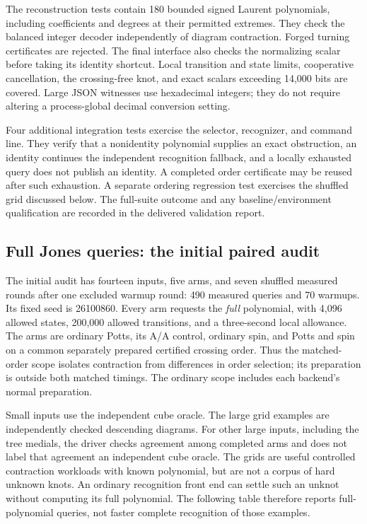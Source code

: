 The reconstruction tests contain 180 bounded signed Laurent polynomials,
including coefficients and degrees at their permitted extremes. They check
the balanced integer decoder independently of diagram contraction. Forged
turning certificates are rejected. The final interface also checks the
normalizing scalar before taking its identity shortcut. Local transition
and state limits, cooperative cancellation, the crossing-free knot,
and exact scalars exceeding 14,000 bits are covered. Large JSON witnesses
use hexadecimal integers; they do not require altering a process-global
decimal conversion setting.

Four additional integration tests exercise the selector, recognizer, and
command line. They verify that a nonidentity polynomial supplies an exact
obstruction, an identity continues the independent recognition fallback,
and a locally exhausted query does not publish an identity. A completed
order certificate may be reused after such exhaustion. A separate ordering
regression test exercises the shuffled grid discussed below. The full-suite
outcome and any baseline/environment qualification are recorded in the
delivered validation report.

\subsection{Full Jones queries: the initial paired audit}

The initial audit has fourteen inputs, five arms, and seven shuffled
measured rounds after one excluded warmup round: 490 measured queries and
70 warmups. Its fixed seed is 26100860. Every arm requests the \emph{full}
polynomial, with 4,096 allowed states, 200,000 allowed transitions, and a
three-second local allowance. The arms are ordinary Potts, its A/A control,
ordinary spin, and Potts and spin on a common separately prepared certified
crossing order. Thus the matched-order scope isolates contraction from
differences in order selection; its preparation is outside both matched
timings. The ordinary scope includes each backend's normal preparation.

Small inputs use the independent cube oracle. The large grid examples
are independently checked descending diagrams. For other large inputs,
including the tree medials, the driver checks agreement among completed
arms and does not label that agreement an independent cube oracle.
The grids are useful controlled contraction workloads with known polynomial,
but are not a corpus of hard unknown knots. An ordinary recognition front
end can settle such an unknot without computing its full polynomial. The following table
therefore reports full-polynomial queries, not faster complete recognition
of those examples.

